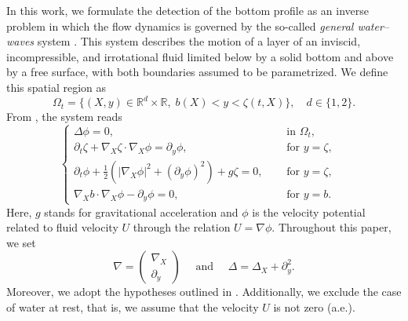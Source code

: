 \documentclass[11pt]{article}
\begin{document}
In this work, we formulate the detection of the bottom profile as an inverse problem in which the flow dynamics is governed by the so-called \textit{general water–waves} system \cite{lannes2013water}. This system describes the motion of a layer of an inviscid, incompressible, and irrotational fluid limited below by a solid bottom and above by a free surface, with both boundaries assumed to be parametrized. We define this spatial region as 
$$\Omega_t=\{(X,y)\in\mathbb{R}^d\times\mathbb{R},\; b(X)<y<\zeta(t,X)\},\quad d\in \{1,2\}.$$
From \cite{lannes2013water}, the system reads
\begin{equation}\label{pd0}
	\left\{
	\begin{array}{ll}
		\Delta\phi =0,&\quad \textrm{ in } \Omega_t,\quad \\
		\partial_t\zeta+\nabla_X\zeta\cdot\nabla_X\phi=\partial_y\phi,&\quad \textrm{ for } y=\zeta, \quad \\
		\partial_t\phi+\frac{1}{2}\left(\left|\nabla_X\phi\right|^2+\left(\partial_y\phi\right)^2\right)+g\zeta=0,&\quad \textrm{ for } y=\zeta, \quad \\
		\nabla_Xb\cdot\nabla_X\phi-\partial_y\phi=0,&\quad \textrm{ for } y=b.\quad 
	\end{array}
	\right.
\end{equation}
Here, $g$ stands for gravitational acceleration and $\phi$ is the velocity potential related to fluid velocity $U$ through the relation $U=\nabla\phi$.
Throughout this paper, we set 
$$\nabla=\begin{pmatrix}
\nabla_X \\[2pt]
\partial_y 
\end{pmatrix}\quad\text{ and }\quad \Delta=\Delta_X+\partial_y^2.$$
Moreover, we adopt the hypotheses outlined in \cite{lannes2013water}.
Additionally, we exclude the case of water at rest, that is, we assume that the velocity $U$ is not zero (a.e.).  
\end{document}
